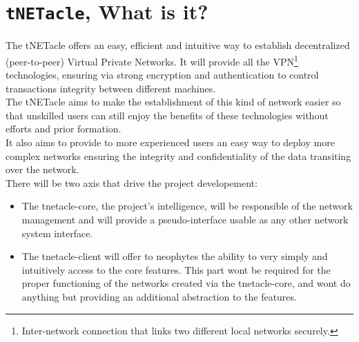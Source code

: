 \section{\texttt{tNETacle}, What is it?}
The tNETacle offers an easy, efficient and intuitive way to establish
decentralized (peer-to-peer) Virtual Private Networks. It will provide all the
VPN\footnote{Inter-network connection that links two different local networks
securely.} technologies, ensuring via strong encryption and authentication to
control transactions integrity between different machines.\\

The tNETacle aims to make the establishment of this kind of network easier so
that unskilled users can still enjoy the benefits of these technologies without efforts and
prior formation.\\

It also aims to provide to more experienced users an easy way to
deploy more complex networks ensuring the integrity and confidentiality of the
data transiting over the network.\\

There will be two axis that drive the project developement:
\begin{itemize}
\item The tnetacle-core, the project's intelligence, will be responsible of the
network management and will provide a pseudo-interface usable as any other
network system interface.
\item The tnetacle-client will offer to neophytes the ability to very simply and
intuitively access to the core features. This part wont be required for the
proper functioning of the networks created via the tnetacle-core, and wont do
anything but providing an additional abstraction to the features.
\end{itemize}
